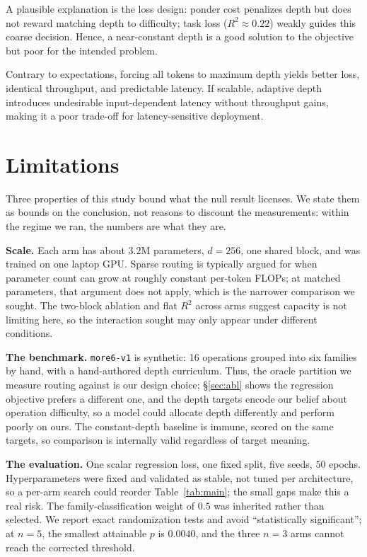 \documentclass{article}
\begin{document}
A plausible explanation is the loss design: ponder cost penalizes depth but does not reward matching depth to difficulty; task loss ($R^2 \approx 0.22$) weakly guides this coarse decision. Hence, a near-constant depth is a good solution to the objective but poor for the intended problem.

Contrary to expectations, forcing all tokens to maximum depth yields better loss, identical throughput, and predictable latency. If scalable, adaptive depth introduces undesirable input-dependent latency without throughput gains, making it a poor trade-off for latency-sensitive deployment.

\section{Limitations}\label{sec:limitations}
\label{sec:limits}

Three properties of this study bound what the null result licenses. We state them as bounds on the conclusion, not reasons to discount the measurements: within the regime we ran, the numbers are what they are.

\textbf{Scale.} Each arm has about $3.2$M parameters, $d=256$, one shared block, and was trained on one laptop GPU. Sparse routing is typically argued for when parameter count can grow at roughly constant per-token FLOPs; at matched parameters, that argument does not apply, which is the narrower comparison we sought. The two-block ablation and flat $R^2$ across arms suggest capacity is not limiting here, so the interaction sought may only appear under different conditions.

\textbf{The benchmark.} \texttt{more6-v1} is synthetic: 16 operations grouped into six families by hand, with a hand-authored depth curriculum. Thus, the oracle partition we measure routing against is our design choice; \S\ref{sec:abl} shows the regression objective prefers a different one, and the depth targets encode our belief about operation difficulty, so a model could allocate depth differently and perform poorly on ours. The constant-depth baseline is immune, scored on the same targets, so comparison is internally valid regardless of target meaning.

\textbf{The evaluation.} One scalar regression loss, one fixed split, five seeds, $50$ epochs. Hyperparameters were fixed and validated as stable, not tuned per architecture, so a per-arm search could reorder Table~\ref{tab:main}; the small gaps make this a real risk. The family-classification weight of $0.5$ was inherited rather than selected. We report exact randomization tests and avoid ``statistically significant''; at $n=5$, the smallest attainable $p$ is $0.0040$, and the three $n=3$ arms cannot reach the corrected threshold.
\end{document}
